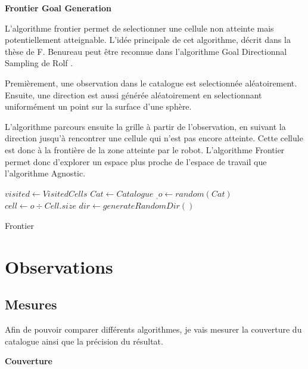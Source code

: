 \documentclass[11pt,french]{report}
\begin{document}
\textbf{Frontier Goal Generation}

\phantom{INVISIBLE LINE}

L'algorithme frontier permet de selectionner une cellule non atteinte mais potentiellement atteignable. L'idée principale de cet algorithme, décrit dans la thèse de F. Benureau \cite{TheseBenureau} peut être reconnue dans l'algorithme Goal Directionnal Sampling de Rolf \cite{Frontier}.

Premièrement, une observation dans le catalogue est selectionnée aléatoirement.
Ensuite, une direction est aussi générée aléatoirement en selectionnant uniformément un point sur la surface d'une sphère.

\phantom{INVISIBLE LINE}

L'algorithme parcours ensuite la grille à partir de l'observation, en suivant la direction jusqu'à rencontrer une cellule qui n'est pas encore atteinte.
Cette cellule est donc à la frontière de la zone atteinte par le robot.
L'algorithme Frontier permet donc d'explorer un espace plus proche de l'espace de travail que l'algorithme Agnostic.

\begin{algorithm}[h]
    \DontPrintSemicolon
    \LinesNumbered
    $visited \leftarrow VisitedCells$ \;
    $Cat \leftarrow Catalogue$ \;
    $_, o \leftarrow random(Cat)$ \;
    $cell \leftarrow o \div Cell.size$ \;
    $dir \leftarrow generateRandomDir()$ \;
    \caption{\label{alg:Frontier} Frontier}
\end{algorithm}


\chapter{Observations}

\section{Mesures}

Afin de pouvoir comparer différents algorithmes, je vais mesurer la couverture du catalogue ainsi que la précision du résultat.

\phantom{INVISIBLE LINE}

\textbf{Couverture}

\phantom{INVISIBLE LINE}
\end{document}
